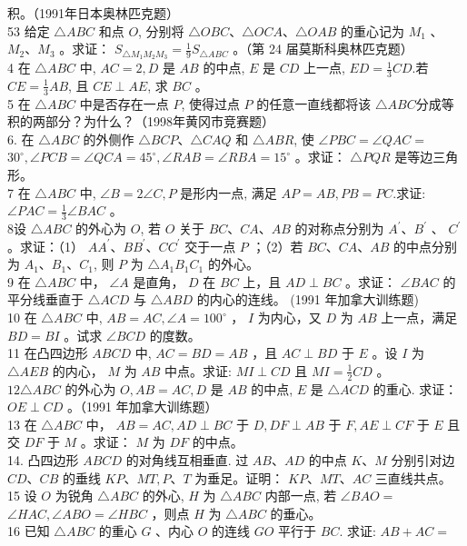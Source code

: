\documentclass[10pt]{article}
\begin{document}
积。（1991年日本奥林匹克题）\\
53 给定 $\triangle A B C$ 和点 $O$, 分别将 $\triangle O B C 、 \triangle O C A 、 \triangle O A B$ 的重心记为 $M_{1}$ 、 $M_{2} 、 M_{3}$ 。求证： $S_{\triangle M_{1} M_{2} M_{3}}=\frac{1}{9} S_{\triangle A B C}$ 。（第 24 届莫斯科奥林匹克题）\\
4 在 $\triangle A B C$ 中, $A C=2, D$ 是 $A B$ 的中点, $E$ 是 $C D$ 上一点, $E D=\frac{1}{3} C D$.若 $C E=\frac{1}{3} A B$, 且 $C E \perp A E$, 求 $B C$ 。\\
5 在 $\triangle A B C$ 中是否存在一点 $P$, 使得过点 $P$ 的任意一直线都将该 $\triangle A B C$分成等积的两部分？为什么？（1998年黄冈市竞赛题）\\
6. 在 $\triangle A B C$ 的外侧作 $\triangle B C P 、 \triangle C A Q$ 和 $\triangle A B R$, 使 $\angle P B C=\angle Q A C=$ $30^{\circ}, \angle P C B=\angle Q C A=45^{\circ}, \angle R A B=\angle R B A=15^{\circ}$ 。求证： $\triangle P Q R$ 是等边三角形。\\
7 在 $\triangle A B C$ 中, $\angle B=2 \angle C, P$ 是形内一点, 满足 $A P=A B, P B=P C$.求证: $\angle P A C=\frac{1}{3} \angle B A C$ 。\\
8设 $\triangle A B C$ 的外心为 $O$, 若 $O$ 关于 $B C 、 C A 、 A B$ 的对称点分别为 $A^{\prime} 、 B^{\prime}$ 、 $C^{\prime}$ 。求证：（1） $A A^{\prime} 、 B B^{\prime} 、 C C^{\prime}$ 交于一点 $P$ ；（2）若 $B C 、 C A 、 A B$ 的中点分别为 $A_{1} 、 B_{1} 、 C_{1}$, 则 $P$ 为 $\triangle A_{1} B_{1} C_{1}$ 的外心。\\
9 在 $\triangle A B C$ 中， $\angle A$ 是直角， $D$ 在 $B C$ 上，且 $A D \perp B C$ 。求证： $\angle B A C$ 的平分线垂直于 $\triangle A C D$ 与 $\triangle A B D$ 的内心的连线。 (1991 年加拿大训练题)\\
10 在 $\triangle A B C$ 中, $A B=A C, \angle A=100^{\circ}$ ， $I$ 为内心，又 $D$ 为 $A B$ 上一点，满足 $B D=B I$ 。试求 $\angle B C D$ 的度数。\\
11 在凸四边形 $A B C D$ 中, $A C=B D=A B$ ，且 $A C \perp B D$ 于 $E$ 。设 $I$ 为 $\triangle A E B$ 的内心， $M$ 为 $A B$ 中点。求证: $M I \perp C D$ 且 $M I=\frac{1}{2} C D$ 。\\
$12 \triangle A B C$ 的外心为 $O, A B=A C, D$ 是 $A B$ 的中点, $E$ 是 $\triangle A C D$ 的重心. 求证： $O E \perp C D$ 。（1991 年加拿大训练题）\\
13 在 $\triangle A B C$ 中， $A B=A C, A D \perp B C$ 于 $D, D F \perp A B$ 于 $F, A E \perp C F$ 于 $E$ 且交 $D F$ 于 $M$ 。求证： $M$ 为 $D F$ 的中点。\\
14. 凸四边形 $A B C D$ 的对角线互相垂直. 过 $A B 、 A D$ 的中点 $K 、 M$ 分别引对边 $C D 、 C B$ 的垂线 $K P 、 M T, P 、 T$ 为垂足。证明： $K P 、 M T 、 A C$ 三直线共点。\\
15 设 $O$ 为锐角 $\triangle A B C$ 的外心, $H$ 为 $\triangle A B C$ 内部一点, 若 $\angle B A O=$ $\angle H A C, \angle A B O=\angle H B C$ ，则点 $H$ 为 $\triangle A B C$ 的垂心。\\
16 已知 $\triangle A B C$ 的重心 $G$ 、内心 $O$ 的连线 $G O$ 平行于 $B C$. 求证: $A B+A C=$
\end{document}
